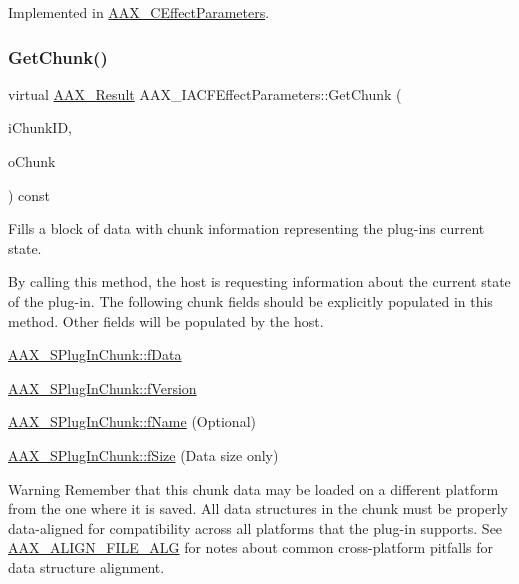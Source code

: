 Implemented in \mbox{\hyperlink{a01481_aade2d4ba2fcb8c302917caf4bfb0f8cf}{A\+A\+X\+\_\+\+C\+Effect\+Parameters}}.

\mbox{\label{a01669_ab977041a440a9cd6f3e631c059ee8b99}} 
\subsubsection{\texorpdfstring{GetChunk()}{GetChunk()}}
{\footnotesize\ttfamily virtual \mbox{\hyperlink{a00392_a4d8f69a697df7f70c3a8e9b8ee130d2f}{A\+A\+X\+\_\+\+Result}} A\+A\+X\+\_\+\+I\+A\+C\+F\+Effect\+Parameters\+::\+Get\+Chunk (\begin{DoxyParamCaption}\item[{\mbox{\hyperlink{a00392_ac678f9c1fbcc26315d209f71a147a175}{A\+A\+X\+\_\+\+C\+Type\+ID}}}]{i\+Chunk\+ID,  }\item[{\mbox{\hyperlink{a01421}{A\+A\+X\+\_\+\+S\+Plug\+In\+Chunk}} $\ast$}]{o\+Chunk }\end{DoxyParamCaption}) const\hspace{0.3cm}{\ttfamily [pure virtual]}}



Fills a block of data with chunk information representing the plug-\/in\textquotesingle{}s current state. 

By calling this method, the host is requesting information about the current state of the plug-\/in. The following chunk fields should be explicitly populated in this method. Other fields will be populated by the host.

\begin{DoxyItemize}
\item \mbox{\hyperlink{a01421_abc76d66fffa4a59ee5cfdbdd992c532c}{A\+A\+X\+\_\+\+S\+Plug\+In\+Chunk\+::f\+Data}} \item \mbox{\hyperlink{a01421_ac114fd94e7b12c235f9c18bcbbc46f06}{A\+A\+X\+\_\+\+S\+Plug\+In\+Chunk\+::f\+Version}} \item \mbox{\hyperlink{a01421_a1b07e29358b5549739f674e04653a6bc}{A\+A\+X\+\_\+\+S\+Plug\+In\+Chunk\+::f\+Name}} (Optional) \item \mbox{\hyperlink{a01421_ac08f37f1ed50eac8ac3ca4bf5494c84d}{A\+A\+X\+\_\+\+S\+Plug\+In\+Chunk\+::f\+Size}} (Data size only)\end{DoxyItemize}
\begin{DoxyWarning}{Warning}
Remember that this chunk data may be loaded on a different platform from the one where it is saved. All data structures in the chunk must be properly data-\/aligned for compatibility across all platforms that the plug-\/in supports. See \mbox{\hyperlink{a00392_a8fbeac3c5db5ac694e85a021ed74dc9e}{A\+A\+X\+\_\+\+A\+L\+I\+G\+N\+\_\+\+F\+I\+L\+E\+\_\+\+A\+LG}} for notes about common cross-\/platform pitfalls for data structure alignment.
\end{DoxyWarning}

